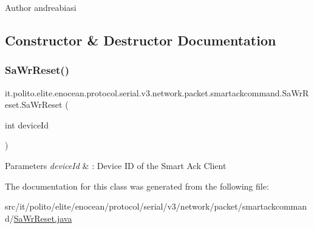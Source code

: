 \begin{DoxyAuthor}{Author}
andreabiasi 
\end{DoxyAuthor}


\subsection{Constructor \& Destructor Documentation}
\hypertarget{classit_1_1polito_1_1elite_1_1enocean_1_1protocol_1_1serial_1_1v3_1_1network_1_1packet_1_1smartackcommand_1_1_sa_wr_reset_a1ac1798efd542136bef017a732e8ecdb}{}\label{classit_1_1polito_1_1elite_1_1enocean_1_1protocol_1_1serial_1_1v3_1_1network_1_1packet_1_1smartackcommand_1_1_sa_wr_reset_a1ac1798efd542136bef017a732e8ecdb} 
\subsubsection{\texorpdfstring{Sa\+Wr\+Reset()}{SaWrReset()}}
{\footnotesize\ttfamily it.\+polito.\+elite.\+enocean.\+protocol.\+serial.\+v3.\+network.\+packet.\+smartackcommand.\+Sa\+Wr\+Reset.\+Sa\+Wr\+Reset (\begin{DoxyParamCaption}\item[{int}]{device\+Id }\end{DoxyParamCaption})}


\begin{DoxyParams}{Parameters}
{\em device\+Id} & \+: Device ID of the Smart Ack Client \\
\hline
\end{DoxyParams}


The documentation for this class was generated from the following file\+:\begin{DoxyCompactItemize}
\item 
src/it/polito/elite/enocean/protocol/serial/v3/network/packet/smartackcommand/\hyperlink{_sa_wr_reset_8java}{Sa\+Wr\+Reset.\+java}\end{DoxyCompactItemize}
